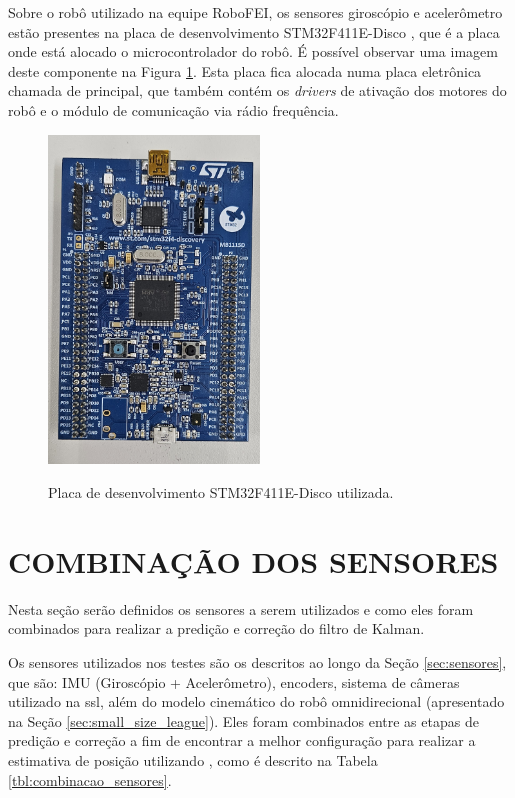 \documentclass[acronym, symbols, table]{fei}
\begin{document}
		Sobre o robô utilizado na equipe RoboFEI, os sensores giroscópio e acelerômetro estão presentes na placa de desenvolvimento STM32F411E-Disco \cite{datasheet_micro}, que é a placa onde está alocado o microcontrolador do robô. É possível observar uma imagem deste componente na Figura \ref{fig:stm32f411}. Esta placa fica alocada numa placa eletrônica chamada de principal, que também contém os \textit{drivers} de ativação dos motores do robô e o módulo de comunicação via rádio frequência.
		
		\begin{figure}[!htb]
			\centering
			\caption{Placa de desenvolvimento STM32F411E-Disco utilizada.}
			\includegraphics[width=0.5\textwidth]{stm32f411.jpg}
			\label{fig:stm32f411}
		\end{figure}
		
	\section{COMBINAÇÃO DOS SENSORES}\label{sec:metodologia_comb_sensores}
	
		Nesta seção serão definidos os sensores a serem utilizados e como eles foram combinados para realizar a predição e correção do filtro de Kalman.
		
		Os sensores utilizados nos testes são os descritos ao longo da Seção \ref{sec:sensores}, que são: IMU (Giroscópio + Acelerômetro), encoders, sistema de câmeras utilizado na \acrshort{ssl}, além do modelo cinemático do robô omnidirecional (apresentado na Seção \ref{sec:small_size_league}). Eles foram combinados entre as etapas de predição e correção a fim de encontrar a melhor configuração para realizar a estimativa de posição utilizando , como é descrito na Tabela \ref{tbl:combinacao_sensores}.
		
\end{document}
